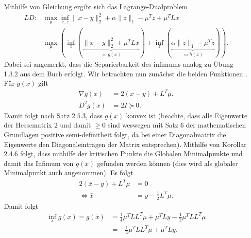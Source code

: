 \documentclass[ngerman, a4paper,12pt]{article}
\begin{document}
Mithilfe von Gleichung  ergibt sich das Lagrange-Dualproblem
\begin{equation*}
	\begin{split}
	LD: &\max_{\mu} \inf_{x,z} \|x-y\|_2^2+\alpha\|z\|_1 - \mu^Tz + \mu^TLx \\
			&\max_{\mu} \left( \inf_{x} \left( \underbrace{\|x-y\|_2^2 + \mu^TLx}_{\eqqcolon g(x)}  \right) + \inf_{z} \left( 
			\underbrace{\alpha\|z\|_1 - \mu^Tz}_{\eqqcolon h(x)}  \right) \right).
	\end{split}
\end{equation*}
Dabei sei angemerkt, dass die Separierbarkeit des infimums analog zu Übung 1.3.2 aus dem Buch erfolgt. Wir betrachten nun zunächst die beiden Funktionen .
Für $g(x)$ gilt
\begin{equation*}
	\begin{split}
		\nabla g(x) &= 2(x-y) + L^T\mu. \\
		D^2 g(x) &= 2 I \succeq 0.
	\end{split}
\end{equation*}
Damit folgt nach Satz 2.5.3, dass $g(x)$ konvex ist (beachte, dass alle Eigenwerte der Hessematrix $2$ und damit $\geq 0$ sind weswegen mit Satz 6 der mathematischen Grundlagen positive semi-definitheit folgt, da bei einer Diagonalmatrix die Eigenwerte den Diagonaleinträgen der Matrix entsprechen). Mithilfe von Korollar 2.4.6 folgt, dass mithilfe der kritischen Punkte die Globalen Minimalpunkte und damit das Infimum von $g(x)$ gefunden werden können (dies wird als globaler Minimalpunkt auch angenommen). Es folgt
\begin{equation*}
	\begin{split}
	  2( \bar{x}-y)+L^T\mu &\stackrel{!}{=}0 \\
	  \Leftrightarrow \bar{x}&=y-\frac{1}{2} L^T\mu.
	\end{split}
\end{equation*}
Damit folgt 
\begin{equation*}
	\begin{split}
		\inf_x g(x) = g( \bar{x} ) &=\frac{1}{4}\mu^TLL^T\mu+\mu^TLy-\frac{1}{2}\mu^TLL^T\mu \\ &=-\frac{1}{4}\mu^TLL^T\mu+\mu^TLy.
	\end{split}
\end{equation*}
\end{document}

